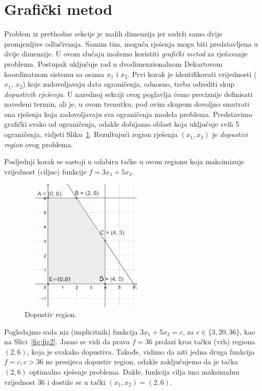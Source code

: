 \documentclass[b5paper, utf8, 11pt, colorlinks]{book}
\theoremstyle{definition}
\begin{document}
\section{Grafički metod}
 Problem iz prethodne sekcije je malih dimenzija jer sadrži samo dvije promjenljive odlučivanja. Samim tim,  moguća rješenja mogu biti predstavljena u dvije dimenzije. U ovom slučaju možemo koristiti \emph{grafički metod} za rješavanje problema. Postupak uključuje rad u dvodimenzionalnom Dekartovom koordinatnom sistemu sa osama $x_1$ i $x_2$.  Prvi korak je identifikovati vrijednosti ($x_1$, $x_2$) koje zadovoljavaju data ograničenja, odnosno, treba odrediti skup \emph{dopustivih rješenja}.    U narednoj sekciji ovog poglavlja ćemo preciznije definisati navedeni termin, ali je, u ovom trenutku, pod ovim skupom dovoljno smatrati ona rješenja koja zadovoljavaju sva ograničenja modela  problema. Predstavimo grafički svako od ograničenja, odakle dobijamo oblast koja uključuje svih 5 ograničenja, vidjeti Sliku~\ref{fig:fig1}.  Rezultujući region rješenja $(x_1, x_2)$ je \emph{dopustivi region} ovog problema.
 
 Posljednji korak se sastoji u odabiru tačke u ovom regionu  koja maksimizuje vrijednost (ciljne) funkcije $f = 3x_1 + 5x_2$. 

\begin{figure}
    \centering
    \includegraphics[width=180pt,height=180pt]{fig1.eps}
    \caption{Dopustiv region.}
    \label{fig:fig1}
\end{figure}
Pogledajmo sada niz (implicitnih) funkcija $3x_1 + 5 x_2 = c$, za $c \in \{3,20, 36\}$, kao na Slici~\ref{fig:fig2}. Jasno se vidi da prava $f = 36$ prolazi kroz tačku (vrh) regiona $(2,6)$, koja je svakako dopustiva. Takođe, vidimo da niti jedna druga funkcija $f=c, c > 36$ ne presijeca dopustiv region, odakle zaključujemo da je tačka $(2, 6)$ optimalno rješenje problema. Dakle, funkcija cilja ima maksimalnu vrijednost 36 i dostiže se u tački $(x_1, x_2)=(2,6)$.
\end{document}
